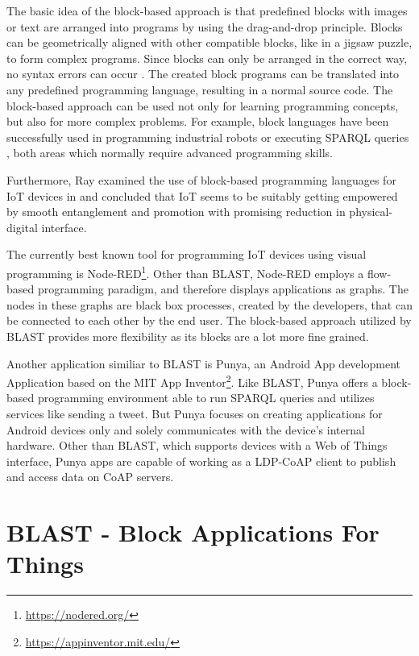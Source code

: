 \documentclass[runningheads]{llncs}
\begin{document}
The basic idea of the block-based approach is that predefined blocks with images or text are arranged into programs by using the drag-and-drop principle.
Blocks can be geometrically aligned with other compatible blocks, like in a jigsaw puzzle, to form complex programs.
Since blocks can only be arranged in the correct way, no syntax errors can occur \cite{10.11453341221} \cite{maloney2010scratch} \cite{10.1145/1089733.1089734} \cite{lye2014review}.
The created block programs can be translated into any predefined programming language, resulting in a normal source code. 
The block-based approach can be used not only for learning programming concepts, but also for more complex problems.
For example, block languages have been successfully used in programming industrial robots \cite{8120406} \cite{ghazal2016framework} \cite{tomlein2017visual} or executing SPARQL queries \cite{7369012}, both areas which normally require advanced programming skills.

Furthermore, Ray examined the use of block-based programming languages for IoT devices in \cite{ray2017survey} and concluded that IoT seems to be suitably getting empowered by smooth entanglement and promotion with promising reduction in physical-digital interface. %

The currently best known tool for programming IoT devices using visual programming is Node-RED\footnote{\url{https://nodered.org/}}.
Other than BLAST, Node-RED employs a flow-based programming paradigm, and therefore displays applications as graphs.
The nodes in these graphs are black box processes, created by the developers, that can be connected to each other by the end user.
The block-based approach utilized by BLAST provides more flexibility as its blocks are a lot more fine grained.

Another application similiar to BLAST is Punya\cite{patton2021punya}, an Android App development Application based on the MIT App Inventor\footnote{\url{https://appinventor.mit.edu/}}.
Like BLAST, Punya offers a block-based programming environment able to run SPARQL queries and utilizes services like sending a tweet.
But Punya focuses on creating applications for Android devices only and solely communicates with the device's internal hardware.
Other than BLAST, which supports devices with a Web of Things interface, Punya apps are capable of working as a LDP-CoAP client to publish and access data on CoAP servers.

\section{BLAST - Block Applications For Things}
\end{document}
